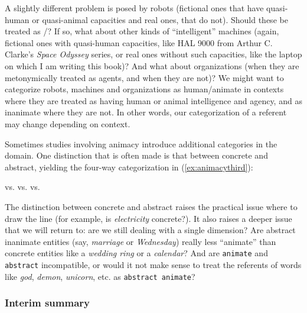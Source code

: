A slightly different problem is posed by robots (fictional ones that have quasi\hyp{}human  or quasi\hyp{}animal capacities and real ones, that do not). Should these be treated as /? If so, what about other kinds of ``intelligent'' machines (again, fictional ones with quasi\hyp{}human  capacities, like HAL 9000 from Arthur C. Clarke's \textit{Space Odyssey} series, or real ones without such capacities, like the laptop on which I am writing this book)? And what about organizations (when they are metonymically  treated as agents,  and when they are not)? We might want to categorize  robots, machines and organizations as human\slash animate  in contexts where they are treated as having human or animal  intelligence and agency, and as inanimate  where they are not. In other words, our categorization  of a referent may change depending on context.

Sometimes studies involving animacy  introduce additional categories  in the  domain. One distinction that is often made is that between concrete and abstract, yielding the four\hyp{}way categorization in (\ref{ex:animacythird}):

\begin{exe}
\ex {} vs.  vs.  vs. 
\label{ex:animacythird}
\end{exe}

The distinction between concrete  and abstract raises the practical issue where to draw the line (for example, is \textit{electricity} concrete?).  It also raises a deeper issue that we will return to: are we still dealing with a single dimension? Are abstract inanimate entities (say, \textit{marriage} or \textit{Wednesday}) really less ``animate''  than concrete entities like a \textit{wedding ring} or a \textit{calendar}? And are \texttt{animate} and \texttt{abstract} incompatible, or would it not make sense to treat the referents of words like \textit{god}, \textit{demon}, \textit{unicorn}, etc. as \texttt{abstract  animate}?

\subsubsection{Interim summary}
\label{sec:operationalizingsummary}


